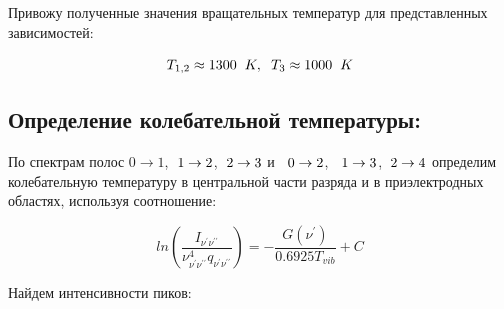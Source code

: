 \begin{figure}[h!]
	\label{fig:image}
\end{figure}

Привожу полученные значения вращательных температур для представленных зависимостей:

\begin{displaymath}
T_{1,2} \approx 1300\hspace{2mm} K,\hspace{2mm}T_3 \approx 1000\hspace{2mm}K
\end{displaymath}

\subsection{Определение колебательной температуры:}

По спектрам полос $0 \rightarrow 1$,$\hspace{2mm} 1\rightarrow 2$,$\hspace{2mm} 2\rightarrow 3$ и $ \hspace{2mm} 0\rightarrow 2$, $ \hspace{2mm} 1\rightarrow 3$,$ \hspace{2mm} 2\rightarrow 4$
определим колебательную
температуру в центральной части разряда и в приэлектродных областях, используя соотношение:

\begin{displaymath}
ln(\frac{I_{\nu^{\prime}\nu^{\prime \prime}}}{\nu^4_{\nu^{\prime}\nu^{\prime \prime}}q_{\nu^{\prime}\nu^{\prime \prime}}}) = -\frac{G(\nu^{\prime})}{0.6925T_{vib}}+C
\end{displaymath}

Найдем интенсивности пиков:


